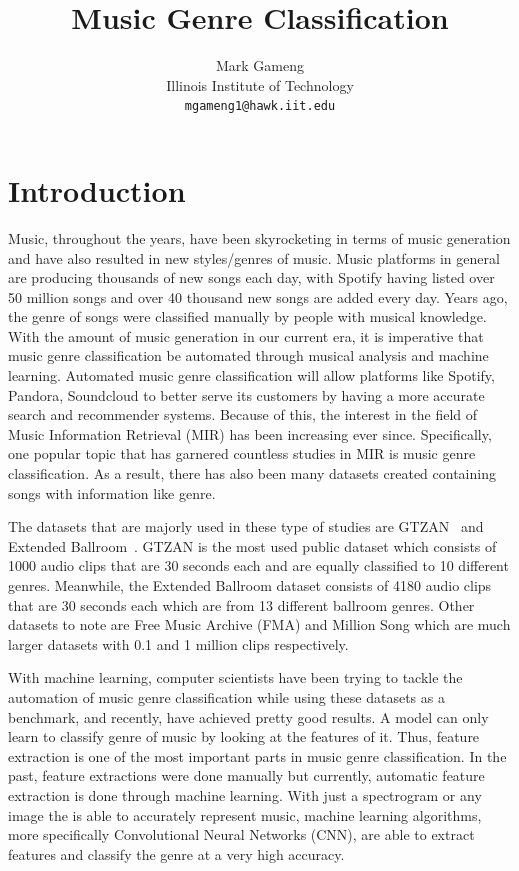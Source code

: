 \documentclass[10pt,twocolumn,letterpaper]{article}
\begin{document}
	
	\title{Music Genre Classification}
	
	\author{Mark Gameng\\
		Illinois Institute of Technology\\
		{\tt\small mgameng1@hawk.iit.edu}
	}
	
	\maketitle
	
	\section{Introduction}
	
	Music, throughout the years, have been skyrocketing in terms of music generation and have also resulted in new styles/genres of music. Music platforms in general are producing thousands of new songs each day, with Spotify having listed over 50 million songs and over 40 thousand new songs are added every day. Years ago, the genre of songs were classified manually by people with musical knowledge. With the amount of music generation in our current era, it is imperative that music genre classification be automated through musical analysis and machine learning. Automated music genre classification will allow platforms like Spotify, Pandora, Soundcloud to better serve its customers by having a more accurate search and recommender systems. Because of this, the interest in the field of Music Information Retrieval (MIR) has been increasing ever since. Specifically, one popular topic that has garnered countless studies in MIR is music genre classification. As a result, there has also been many datasets created containing songs with information like genre.
	
	The datasets that are majorly used in these type of studies are GTZAN~\cite{tzanetakis2002musical} and Extended Ballroom~\cite{marchand2016extended}. GTZAN is the most used public dataset which consists of 1000 audio clips that are 30 seconds each and are equally classified to 10 different genres. Meanwhile, the Extended Ballroom dataset consists of 4180 audio clips that are 30 seconds each which are from 13 different ballroom genres. Other datasets to note are Free Music Archive (FMA) and Million Song which are much larger datasets with 0.1 and 1 million clips respectively.
	
	With machine learning, computer scientists have been trying to tackle the automation of music genre classification while using these datasets as a benchmark, and recently, have achieved pretty good results. A model can only learn to classify genre of music by looking at the features of it. Thus, feature extraction is one of the most important parts in music genre classification. In the past, feature extractions were done manually but currently, automatic feature extraction is done through machine learning. With just a spectrogram or any image the is able to accurately represent music, machine learning algorithms, more specifically Convolutional Neural Networks (CNN), are able to extract features and classify the genre at a very high accuracy.
	
\end{document}
